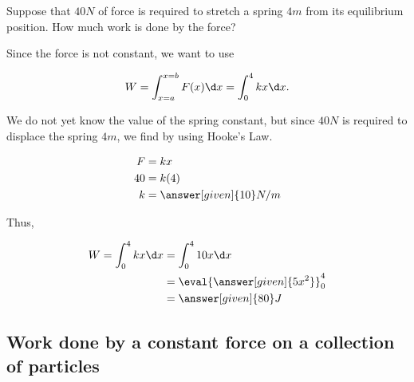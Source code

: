 \documentclass{ximera}
\begin{document}
\begin{example}
Suppose that $40 N$ of force is required to stretch a spring $4m$ from its equilibrium position.  How much work is done by the force?

\begin{explanation}
Since the force is not constant, we want to use

\[W=\int_{x=a}^{x=b} F(x) \d x = \int_0^4 kx \d x . \]

We do not yet know the value of the spring constant, but since $40 N$ is required to displace the spring $4m$, we find by using Hooke's Law.

\begin{align*}
F &= kx \\
40 &= k(4) \\
k &= \answer[given]{10} N/m
\end{align*}

Thus, 

\begin{align*}
W= \int_0^4 kx \d x &= \int_0^4 10x \d x \\
&= \eval{\answer[given]{5x^2}}_0^4 \\
&= \answer[given]{80} J
\end{align*}


\end{explanation}

\end{example}




\subsection{Work done by a constant force on a collection of particles}

  
\end{document}
